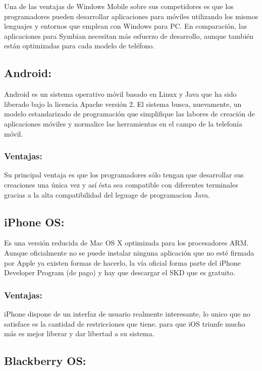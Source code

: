 \documentclass{bmcart}
\begin{document}
Una de las ventajas de Windows Mobile sobre sus competidores es que los
programadores pueden desarrollar aplicaciones para móviles utilizando los mismos
lenguajes y entornos que emplean con Windows para PC. En comparación, las
aplicaciones para Symbian necesitan más esfuerzo de desarrollo, aunque también
están optimizadas para cada modelo de teléfono.


\subsection*{Android:}

Android es un sistema operativo móvil basado en Linux y Java que ha sido
liberado bajo la licencia Apache versión 2.
El sistema busca, nuevamente, un modelo estandarizado de programación que
simplifique las labores de creación de aplicaciones móviles y normalice las
herramientas en el campo de la telefonía móvil. 

\subsubsection*{Ventajas:}

Su principal ventaja es que los programadores sólo tengan que desarrollar sus creaciones
una única vez y así ésta sea compatible con diferentes terminales gracias a la alta compatibilidad del leguage de programacion Java. 


\subsection*{ iPhone OS:}

Es una versión reducida de Mac OS X optimizada para los procesadores
ARM. Aunque oficialmente no se puede instalar ninguna aplicación que no esté
firmada por Apple ya existen formas de hacerlo, la vía oficial forma parte del iPhone
Developer Program (de pago) y hay que descargar el SKD que es gratuito.

\subsubsection*{Ventajas:}

iPhone dispone de un interfaz de usuario realmente interesante, lo unico que no satisface es la
cantidad de restricciones que tiene. para que iOS
triunfe mucho más es mejor liberar y dar libertad a su sistema.


\subsection*{ Blackberry OS:}
\end{document}

